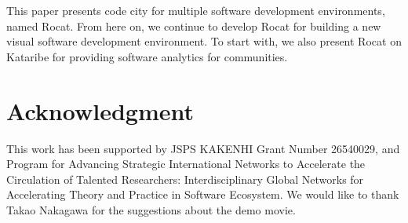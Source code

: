 \documentclass[conference]{IEEEtran}
\begin{document}
This paper presents code city for multiple software development environments, named Rocat.
From here on, we continue to develop Rocat for building a new visual software development environment.
To start with, we also present Rocat on Kataribe for providing software analytics for communities.

\section*{Acknowledgment}
This work has been supported by JSPS KAKENHI Grant Number 26540029, and Program for Advancing Strategic International Networks to Accelerate the Circulation of Talented Researchers: Interdisciplinary Global Networks for Accelerating Theory and Practice in Software Ecosystem.
We would like to thank Takao Nakagawa for the suggestions about the demo movie.





\end{document}
